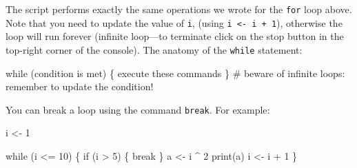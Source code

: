 \documentclass[
  letterpaper,
  DIV=11,
  numbers=noendperiod]{scrreprt}
\newenvironment{Shaded}{\begin{snugshade}}{\end{snugshade}}
\newcommand{\CommentTok}[1]{\textcolor[rgb]{0.37,0.37,0.37}{#1}}
\newcommand{\ControlFlowTok}[1]{\textcolor[rgb]{0.00,0.23,0.31}{#1}}
\newcommand{\DecValTok}[1]{\textcolor[rgb]{0.68,0.00,0.00}{#1}}
\newcommand{\FunctionTok}[1]{\textcolor[rgb]{0.28,0.35,0.67}{#1}}
\newcommand{\NormalTok}[1]{\textcolor[rgb]{0.00,0.23,0.31}{#1}}
\newcommand{\OtherTok}[1]{\textcolor[rgb]{0.00,0.23,0.31}{#1}}
\newcommand{\SpecialCharTok}[1]{\textcolor[rgb]{0.37,0.37,0.37}{#1}}
\begin{document}
The script performs exactly the same operations we wrote for the
\texttt{for} loop above. Note that you need to update the value of
\texttt{i}, (using \texttt{i\ \textless{}-\ i\ +\ 1}), otherwise the
loop will run forever (infinite loop---to terminate click on the stop
button in the top-right corner of the console). The anatomy of the
\texttt{while} statement:

\begin{Shaded}
\begin{Highlighting}[]
\ControlFlowTok{while}\NormalTok{ (condition is met) \{}
\NormalTok{  execute these commands}
\NormalTok{\} }\CommentTok{\# beware of infinite loops: remember to update the condition!}
\end{Highlighting}
\end{Shaded}

You can break a loop using the command \texttt{break}. For example:

\begin{Shaded}
\begin{Highlighting}[]
\NormalTok{i }\OtherTok{\textless{}{-}} \DecValTok{1}

\ControlFlowTok{while}\NormalTok{ (i }\SpecialCharTok{\textless{}=} \DecValTok{10}\NormalTok{) \{}
  \ControlFlowTok{if}\NormalTok{ (i }\SpecialCharTok{\textgreater{}} \DecValTok{5}\NormalTok{) \{}
    \ControlFlowTok{break}
\NormalTok{  \}}
\NormalTok{  a }\OtherTok{\textless{}{-}}\NormalTok{ i }\SpecialCharTok{\^{}} \DecValTok{2}
  \FunctionTok{print}\NormalTok{(a)}
\NormalTok{  i }\OtherTok{\textless{}{-}}\NormalTok{ i }\SpecialCharTok{+} \DecValTok{1}
\NormalTok{\}}
\end{Highlighting}
\end{Shaded}
\end{document}
